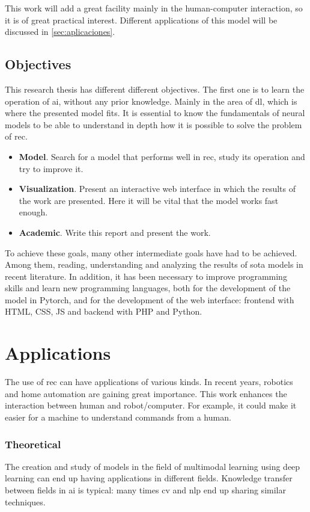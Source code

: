 This work will add a great facility mainly in the human-computer interaction,
so it is of great practical interest. Different applications of this model will
be discussed in \vref{sec:aplicaciones}.

\subsection{Objectives}

This research thesis has different different objectives. The first one is to
learn the operation of \gls{ai}, without any prior knowledge. Mainly in the
area of \gls{dl}, which is where the presented model fits. It is essential to
know the fundamentals of neural models to be able to understand in depth how it
is possible to solve the problem of \gls{rec}.

\begin{itemize}
  \item \textbf{Model}. Search for a model that performs well in \gls{rec},
  study its operation and try to improve it.
  \item \textbf{Visualization}. Present an interactive web interface in which
  the results of the work are presented. Here it will be vital that the model
  works fast enough.
  \item \textbf{Academic}. Write this report and present the work.
\end{itemize}

To achieve these goals, many other intermediate goals have had to be
achieved. Among them, reading, understanding and analyzing the results of
\gls{sota} models in recent literature. In addition, it has been necessary to
improve programming skills and learn new programming languages, both for the
development of the model in Pytorch, and for the development of the web
interface: frontend with HTML, CSS, JS and backend with PHP and Python.


\section{Applications} \label{sec:aplicaciones}

The use of \gls{rec} can have applications of various kinds. In recent years,
robotics and home automation are gaining great importance. This work enhances
the interaction between human and robot/computer. For example, it could make it
easier for a machine to understand commands from a human.

\subsubsection{Theoretical}
The creation and study of models in the field of multimodal learning using deep
learning can end up having applications in different fields. Knowledge transfer
between fields in \gls{ai} is typical: many times \gls{cv} and \gls{nlp} end up
sharing similar techniques.

